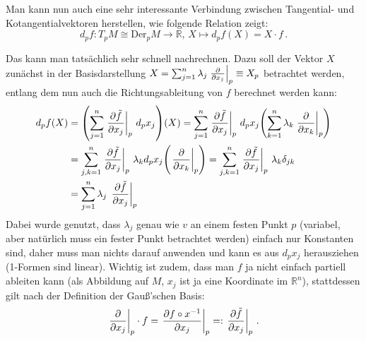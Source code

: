\documentclass[../H_Analysis_main.tex]{subfiles}
\begin{document}
\begin{bsp}\label{bsp:fktkeimderiv}
Man kann nun auch eine sehr interessante Verbindung zwischen Tangential- und Kotangentialvektoren herstellen, wie folgende Relation zeigt:
\begin{equation}
d_p f: T_p M \cong \text{Der}_p M \rightarrow \mathbb{R}, \, X \mapsto d_p f(X) = X \cdot f \, .
\end{equation}

Das kann man tatsächlich sehr schnell nachrechnen. Dazu soll der Vektor $X$ zunächst in der Basisdarstellung $X = \sum_{j = 1}^n \lambda_j \eval{\pdv{x_j}}_p \equiv X_p$ betrachtet werden, entlang dem nun auch die Richtungsableitung von $f$ berechnet werden kann:
\begin{align*}
d_p f(X) &= \qty(\sum_{j = 1}^n \eval{\pdv{\tilde{f}}{x_j}}_p \, d_p x_j)(X) = \sum_{j = 1}^n \eval{\pdv{\tilde{f}}{x_j}}_p \, d_p x_j \qty(\sum_{k = 1}^n \lambda_k \eval{\pdv{x_k}}_p)
\\
&= \sum_{j, k = 1}^n \eval{\pdv{\tilde{f}}{x_j}}_p \, \lambda_k d_p x_j \qty(\eval{\pdv{x_k}}_p) = \sum_{j, k = 1}^n \eval{\pdv{\tilde{f}}{x_j}}_p \, \lambda_k \delta_{jk}
\\
&= \sum_{j = 1}^n \lambda_j \, \eval{\pdv{\tilde{f}}{x_j}}_p
\end{align*}
Dabei wurde genutzt, dass $\lambda_j$ genau wie $v$ an einem festen Punkt $p$ (variabel, aber natürlich muss ein fester Punkt betrachtet werden) einfach nur Konstanten sind, daher muss man nichts darauf anwenden und kann es aus $d_p x_j$ herausziehen (1-Formen sind linear). Wichtig ist zudem, dass man $f$ ja nicht einfach partiell ableiten kann (als Abbildung auf $M$, $x_j$ ist ja eine Koordinate im $\mathbb{R}^n$), stattdessen gilt nach der Definition der Gauß'schen Basis:
\begin{equation}
\eval{\pdv{x_j}}_p \cdot f = \eval{\pdv{f \circ x^{-1}}{x_j}}_p =: \eval{\pdv{\tilde{f}}{x_j}}_p \, .
\end{equation}


\end{bsp}
\end{document}

